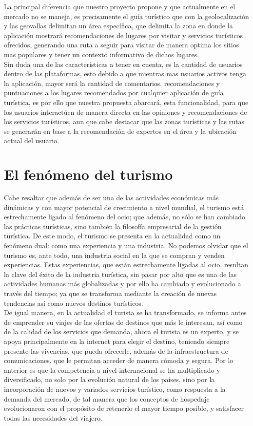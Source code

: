 La principal diferencia que nuestro proyecto propone y que actualmente en el mercado no se maneja, es precisamente el guía turístico que con la geolocalización y las geovallas delimitan un área específica, que delimita la zona en donde la aplicación mostrará recomendaciones de lugares por visitar y servicios turísticos ofrecidos, generando una ruta a seguir para visitar de manera optima los sitios mas populares y tener un contexto informativo de dichos lugares.\\

Sin duda una de las características a tener en cuenta, es la cantidad de usuarios dentro de las plataformas, esto debido a que mientras mas usuarios activos tenga la aplicación, mayor será la cantidad de comentarios, recomendaciones y puntuaciones a los lugares recomendados por cualquier aplicación de guía turística, es por ello que nuestra propuesta abarcará, esta funcionalidad, para que los usuarios interactúen de manera directa en las opiniones y recomendaciones de los servicios turísticos, aun que cabe destacar que las zonas turísticas y las rutas se generarán en base a la recomendación de expertos en el área y la ubicación actual del usuario. \\

\section{El fenómeno del turismo}

Cabe resaltar que además de ser una de las actividades económicas más dinámicas y con mayor potencial de crecimiento a nivel mundial, el turismo está estrechamente ligado al fenómeno del ocio; que además, no sólo se han cambiado las prácticas turísticas, sino también la filosofía empresarial de la gestión turística. De este modo, el turismo se presenta en la actualidad como un fenómeno dual: como una experiencia y una industria. No podemos olvidar que el turismo es, ante todo, una industria social en la que se compran y venden experiencias. Estas experiencias, que están estrechamente ligadas al ocio, resultan la clave del éxito de la industria turística, sin pasar por alto que es una de las actividades humanas más globalizadas y por ello ha cambiado y evolucionado a través del tiempo; ya que se transforma mediante la creación de nuevas tendencias así como nuevos destinos turísticos.\\

De igual manera, en la actualidad el turista se ha transformado, se informa antes de emprender su viajes de las ofertas de destinos que más le interesan, así como de la calidad de los servicios que demanda, ahora el turista es un experto, y se apoya principalmente en la internet para elegir el destino, teniendo siempre presente las vivencias, que pueda ofrecerle, además de la infraestructura de comunicaciones, que le permitan acceder de manera cómoda y segura. Por lo anterior es que la competencia a nivel internacional se ha multiplicado y diversificado, no solo por la evolución natural de los países, sino por la incorporación de nuevos y variados servicios turístico, como respuesta a la demanda del mercado, de tal manera que los conceptos de hospedaje evolucionaron con el propósito de retenerlo el mayor tiempo posible, y satisfacer todas las necesidades del viajero.